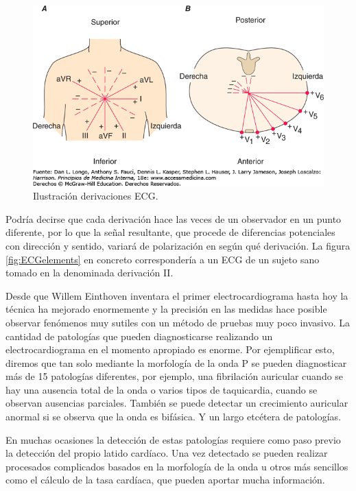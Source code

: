 \begin{figure}[ht]
	\centering
		\includegraphics[width=0.9\linewidth]{figuras/derivations.png}
	\caption{Ilustración derivaciones ECG.\cite{Harrison}}
	\label{fig:derivaciones}
\end{figure} 

Podría decirse que cada derivación hace las veces de un observador en un punto diferente, por lo que la señal resultante, que procede de diferencias potenciales con dirección y sentido, variará de polarización en según qué derivación. La figura \ref{fig:ECGelements} en concreto correspondería a un ECG de un sujeto sano tomado en la denominada derivación II.

Desde que Willem Einthoven inventara el primer electrocardiograma hasta hoy la técnica ha mejorado enormemente y la precisión en las medidas hace posible observar fenómenos muy sutiles con un método de pruebas muy poco invasivo. La cantidad de patologías que pueden diagnosticarse realizando un electrocardiograma en el momento apropiado es enorme. \cite{PatologiasECG} Por ejemplificar esto, diremos que tan solo mediante la morfología de la onda P se pueden diagnosticar más de 15 patologías diferentes, por ejemplo, una fibrilación auricular cuando se hay una ausencia total de la onda o varios tipos de taquicardia, cuando se observan ausencias parciales. También se puede detectar un crecimiento auricular anormal si se observa que la onda es bifásica. Y un largo etcétera de patologías.

En muchas ocasiones la detección de estas patologías requiere como paso previo la detección del propio latido cardíaco. Una vez detectado se pueden realizar procesados complicados basados en la morfología de la onda u otros más sencillos como el cálculo de la tasa cardíaca, que pueden aportar mucha información.

